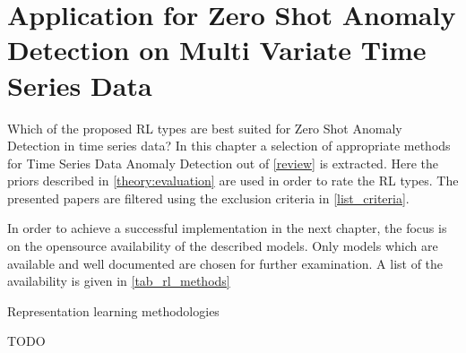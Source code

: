 \section{Application for Zero Shot Anomaly Detection on Multi Variate Time Series Data}\label{application}
 Which of the proposed RL types are best suited for Zero Shot Anomaly Detection in time series data? In this chapter a selection of appropriate methods for Time Series Data Anomaly Detection out of \ref{review} is extracted. Here the priors described in \ref{theory:evaluation} are used in order to rate the RL types. The presented papers are filtered using the exclusion criteria in \ref{list_criteria}.

 In order to achieve a successful implementation in the next chapter, the focus is on the opensource availability of the described models. Only models which are available and well documented are chosen for further examination. A list of the availability is given in \ref{tab_rl_methods}
 \begin{table}
   \caption{Representation learning methodologies}\label{tab_rl_methods}
   
 \end{table}
TODO \cite{fung_model_2024}  %
